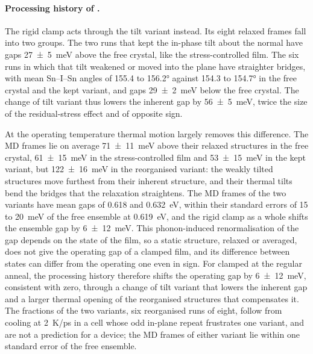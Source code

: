 {{\paragraph{Processing history of \CsSnI{}.}
The rigid clamp acts through the tilt variant instead. Its eight relaxed frames fall into two
groups. The two runs that kept the in-phase tilt about the normal have gaps \SI{27 \pm 5}{meV}
above the free crystal, like the stress-controlled film. The six runs in which that tilt weakened
or moved into the plane have straighter bridges, with mean Sn--I--Sn angles of 155.4 to
\ang{156.2} against 154.3 to \ang{154.7} in the free crystal and the kept variant, and gaps
\SI{29 \pm 2}{meV} below the free crystal. The change of tilt variant thus lowers the inherent
gap by \SI{56 \pm 5}{meV}, twice the size of the residual-stress effect and of opposite sign.

At the operating temperature thermal motion largely removes this difference. The MD frames lie on
average \SI{71 \pm 11}{meV} above their relaxed structures in the free crystal,
\SI{61 \pm 15}{meV} in the stress-controlled film and \SI{53 \pm 15}{meV} in the kept variant,
but \SI{122 \pm 16}{meV} in the reorganised variant: the weakly tilted structures move furthest
from their inherent structure, and their thermal tilts bend the bridges that the relaxation
straightens. The MD frames of the two variants have mean gaps of 0.618 and \SI{0.632}{eV}, within
their standard errors of 15 to \SI{20}{meV} of the free ensemble at \SI{0.619}{eV}, and the rigid
clamp as a whole shifts the ensemble gap by \SI{6 \pm 12}{meV}. This phonon-induced renormalisation
of the gap\cite{Zacharias2016SDM} depends on the state of the film, so a static structure, relaxed
or averaged, does not give the operating gap of a clamped film, and its difference between states
can differ from the operating one even in sign. For \CsSnI{} clamped at the regular anneal, the
processing history therefore shifts the operating gap by \SI{6 \pm 12}{meV}, consistent with zero,
through a change of tilt variant that lowers the inherent gap and a larger thermal opening of the
reorganised structures that compensates it. The fractions of the two variants, six reorganised
runs of eight, follow from cooling at \SI{2}{K/ps} in a cell whose odd in-plane repeat frustrates
one variant, and are not a prediction for a device; the MD frames of either variant lie within one
standard error of the free ensemble.}

}
